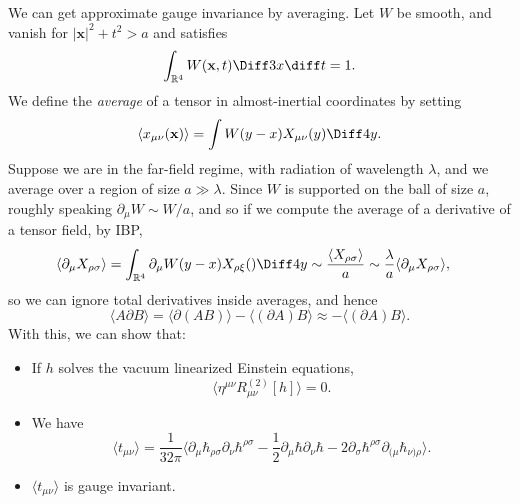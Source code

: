 \documentclass[12pt]{article}
\begin{document}
We can get approximate gauge invariance by averaging. Let $W$ be smooth, and vanish for $|\mathbf{x}|^2 + t^2 > a$ and satisfies
\[
\int_{\mathbb{R}^4} W(\mathbf{x}, t) \Diff 3 x \diff t= 1.
\]
We define the \emph{average} of a tensor in almost-inertial coordinates by setting
\[
\langle x_{\mu\nu}(\mathbf{x})\rangle = \int W(y - x) X_{\mu\nu}(y) \Diff 4 y.
\]
Suppose we are in the far-field regime, with radiation of wavelength $\lambda$, and we average over a region of size $a \gg \lambda$. Since $W$ is supported on the ball of size $a$, roughly speaking $\partial_\mu W \sim W/a$, and so if we compute the average of a derivative of a tensor field, by IBP,
\begin{align*}
	\langle \partial_\mu X_{\rho\sigma} \rangle &= \int_{\mathbb{R}^4} \partial_\mu W (y - x) X_{\rho\xi} () \Diff 4 y \sim \frac{\langle X_{\rho\sigma}\rangle }{a} \sim \frac{\lambda}{a} \langle \partial_\mu X_{\rho\sigma}\rangle,
\end{align*}
so we can ignore total derivatives inside averages, and hence
\[
\langle A \partial B \rangle = \langle \partial(A B) \rangle - \langle (\partial A) B \rangle \approx - \langle (\partial A) B \rangle.
\]
With this, we can show that:
\begin{itemize}
	\item If $h$ solves the vacuum linearized Einstein equations,
		\[
			\langle \eta^{\mu\nu} R_{\mu\nu}^{(2)} [h] \rangle = 0.
		\]
	\item We have
		\[
			\langle t_{\mu\nu} \rangle = \frac 1{32\pi} \langle \partial_\mu \hbar_{\rho\sigma} \partial_\nu \hbar^{\rho\sigma} - \frac 12 \partial_\mu \hbar \partial_\nu \hbar - 2 \partial_\sigma \hbar^{\rho\sigma} \partial_{(\mu} \hbar_{\nu)\rho} \rangle.
		\]
	\item $\langle t_{\mu\nu}\rangle$ is gauge invariant.
\end{itemize}
\end{document}
